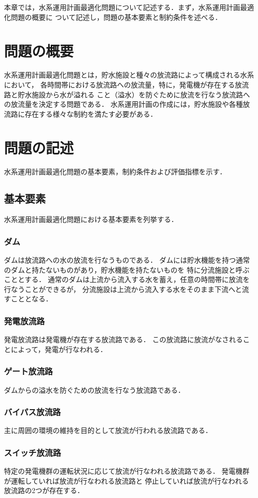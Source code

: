 本章では，水系運用計画最適化問題について記述する．まず，水系運用計画最適化問題の概要に
ついて記述し，問題の基本要素と制約条件を述べる．

\section{問題の概要}
水系運用計画最適化問題とは，貯水施設と種々の放流路によって構成される水系において，%
各時間帯における放流路への放流量，特に，発電機が存在する放流路と貯水施設から水が溢れる%
こと（溢水）を防ぐために放流を行なう放流路への放流量を決定する問題である．
水系運用計画の作成には，貯水施設や各種放流路に存在する様々な制約を満たす必要がある．

\section{問題の記述}
水系運用計画最適化問題の基本要素，制約条件および評価指標を示す．
\subsection{基本要素}
	水系運用計画最適化問題における基本要素を列挙する．
	\subsubsection*{ダム} 
		ダムは放流路への水の放流を行なうものである．
		ダムには貯水機能を持つ通常のダムと持たないものがあり，貯水機能を持たないものを
		特に分流施設と呼ぶこととする．
		通常のダムは上流から流入する水を蓄え，任意の時間帯に放流を行なうことができるが，
		分流施設は上流から流入する水をそのまま下流へと流すこととなる．
	\subsubsection*{発電放流路}
		発電放流路は発電機が存在する放流路である．
		この放流路に放流がなされることによって，発電が行なわれる．
	\subsubsection*{ゲート放流路}
		ダムからの溢水を防ぐための放流を行なう放流路である．
	\subsubsection*{バイパス放流路}
		主に周囲の環境の維持を目的として放流が行われる放流路である．	
	\subsubsection*{スイッチ放流路}
		特定の発電機群の運転状況に応じて放流が行なわれる放流路である．
		発電機群が運転していれば放流が行なわれる放流路と
		停止していれば放流が行なわれる放流路の2つが存在する．
